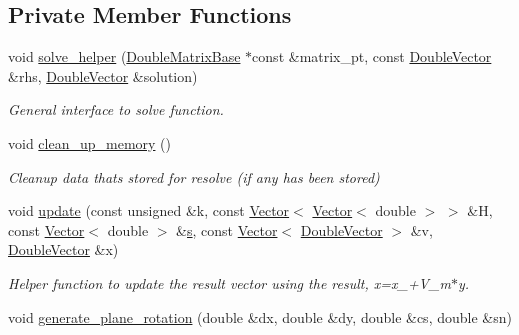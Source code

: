 \subsection*{Private Member Functions}
\begin{DoxyCompactItemize}
\item 
void \hyperlink{classoomph_1_1GMRES_a29da2c2303b12f3f9fa72423f3daf399}{solve\+\_\+helper} (\hyperlink{classoomph_1_1DoubleMatrixBase}{Double\+Matrix\+Base} $\ast$const \&matrix\+\_\+pt, const \hyperlink{classoomph_1_1DoubleVector}{Double\+Vector} \&rhs, \hyperlink{classoomph_1_1DoubleVector}{Double\+Vector} \&solution)
\begin{DoxyCompactList}\small\item\em General interface to solve function. \end{DoxyCompactList}\item 
void \hyperlink{classoomph_1_1GMRES_a5593b936e70b6668758bb94f4097b9b1}{clean\+\_\+up\+\_\+memory} ()
\begin{DoxyCompactList}\small\item\em Cleanup data that\textquotesingle{}s stored for resolve (if any has been stored) \end{DoxyCompactList}\item 
void \hyperlink{classoomph_1_1GMRES_af9ae9481736b87b8371e44c207a57059}{update} (const unsigned \&k, const \hyperlink{classoomph_1_1Vector}{Vector}$<$ \hyperlink{classoomph_1_1Vector}{Vector}$<$ double $>$ $>$ \&H, const \hyperlink{classoomph_1_1Vector}{Vector}$<$ double $>$ \&\hyperlink{cfortran_8h_ab7123126e4885ef647dd9c6e3807a21c}{s}, const \hyperlink{classoomph_1_1Vector}{Vector}$<$ \hyperlink{classoomph_1_1DoubleVector}{Double\+Vector} $>$ \&v, \hyperlink{classoomph_1_1DoubleVector}{Double\+Vector} \&x)
\begin{DoxyCompactList}\small\item\em Helper function to update the result vector using the result, x=x\+\_+\+V\+\_\+m$\ast$y. \end{DoxyCompactList}\item 
void \hyperlink{classoomph_1_1GMRES_ad076ed019b21fa5348e3e65aeba1e27c}{generate\+\_\+plane\+\_\+rotation} (double \&dx, double \&dy, double \&cs, double \&sn)

\end{DoxyCompactItemize}
